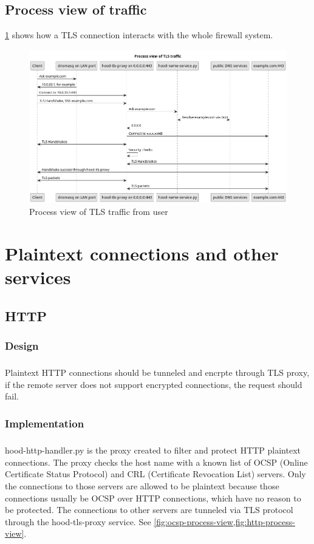 \documentclass[mscthesis]{usiinfthesis}
\begin{document}
\section{Process view of traffic}
\cref{fig:tls-process-view} shows how a TLS connection interacts with the whole firewall system.
\begin{figure}[H]
  \includegraphics[width=\textheight, angle=90]{graphics/puml/process-tls-traffic.png}
  \caption{Process view of TLS traffic from user}
  \label{fig:tls-process-view}
\end{figure}

\chapter{Plaintext connections and other services}\label{cha:plaintext}

\section{HTTP}
\subsection{Design}
\paragraph{}
Plaintext HTTP connections should be tunneled and encrpte through TLS proxy, if the remote server does not support encrypted connections, the request should fail.
\subsection{Implementation}
\paragraph{}
hood-http-handler.py is the proxy created to filter and protect HTTP plaintext connections. The proxy checks the host name with a known list of OCSP (Online Certificate Status Protocol) and CRL (Certificate Revocation List) servers. Only the connections to those servers are allowed to be plaintext because those connections usually be OCSP over HTTP connections, which have no reason to be protected. The connections to other servers are tunneled via TLS protocol through the hood-tls-proxy service. See \cref{fig:ocsp-process-view,fig:http-process-view}.
\end{document}
